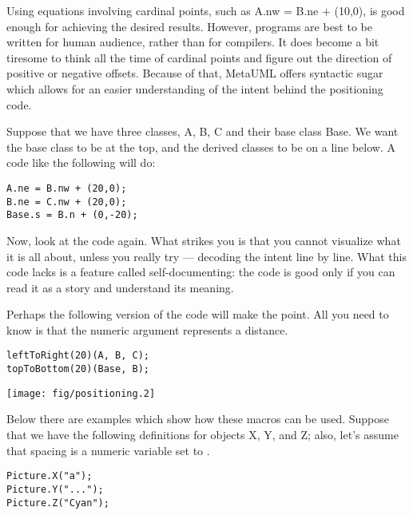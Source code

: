 \documentclass{article}
\newcommand{\code}{\ttfamily}
\begin{document}
Using equations involving cardinal points, such as {\code A.nw = B.ne + (10,0)}, is
good enough for achieving the desired results. However, programs are best to
be written for human audience, rather than for compilers. It does become a bit
tiresome to think all the time of cardinal points and figure out the
direction of positive or negative offsets. Because of that, MetaUML offers
syntactic sugar which allows for an easier understanding of the intent behind
the positioning code.

Suppose that we have three classes, {\code A}, {\code B}, {\code C} and their base class
{\code Base}. We want the base class to be at the top, and the derived classes to be
on a line below. A code like the following will do:

\begin{verbatim}
A.ne = B.nw + (20,0);
B.ne = C.nw + (20,0);
Base.s = B.n + (0,-20);
\end{verbatim}

Now, look at the code again. What strikes you is that you cannot visualize what it is all about, unless you really try --- decoding the intent line by line. What this code lacks is a feature called self-documenting: the code is good only if you can read it as a story and understand its meaning.

Perhaps the following version of the code will make the point. All you need to know is that the numeric argument represents a distance.

\begin{multicols}{2}
\begin{verbatim}
leftToRight(20)(A, B, C);
topToBottom(20)(Base, B);
\end{verbatim}
\columnbreak
\hspace{1cm}\texttt{[image: fig/positioning.2]}
\end{multicols}

Below there are examples which show how these macros can be used. Suppose that we have the following definitions for objects {\code X}, {\code Y}, and {\code Z}; also, let's assume that {\code spacing} is a numeric variable set to {\code 5}.

\begin{verbatim}
Picture.X("a");
Picture.Y("...");
Picture.Z("Cyan");
\end{verbatim}
\end{document}

